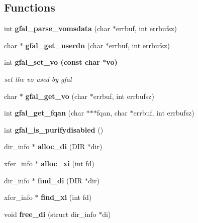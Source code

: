 \subsection*{Functions}
\begin{CompactItemize}
\item 
int \textbf{gfal\_\-parse\_\-vomsdata} (char $\ast$errbuf, int errbufsz)\label{gfal__common_8c_54942230ba2576538e1ad096332950b8}

\item 
char $\ast$ \textbf{gfal\_\-get\_\-userdn} (char $\ast$errbuf, int errbufsz)\label{group__internal__group_g6bd6336b0fee1ff32ad6bc5ef3d96068}

\item 
int \bf{gfal\_\-set\_\-vo} (const char $\ast$vo)\label{group__common__group_gcf4ae9045b7e5a2a697b1bb1f05994a8}

\begin{CompactList}\small\item\em set the vo used by gfal \item\end{CompactList}\item 
char $\ast$ \textbf{gfal\_\-get\_\-vo} (char $\ast$errbuf, int errbufsz)\label{group__internal__group_g1d7294ee456d16c8b1bf40f97ffb5081}

\item 
int \textbf{gfal\_\-get\_\-fqan} (char $\ast$$\ast$$\ast$fqan, char $\ast$errbuf, int errbufsz)\label{group__internal__group_g54b4e29078838583c8022630ef5a2ed3}

\item 
int \textbf{gfal\_\-is\_\-purifydisabled} ()\label{group__internal__group_g3a35f0e6f616c5108f95cfffd557db77}

\item 
dir\_\-info $\ast$ \textbf{alloc\_\-di} (DIR $\ast$dir)\label{gfal__common_8c_8f269e9d06e4dd7d2512f0a6f4d56b1e}

\item 
xfer\_\-info $\ast$ \textbf{alloc\_\-xi} (int fd)\label{gfal__common_8c_5cfad4b7ae4af2b7a5024987d7cdc00f}

\item 
dir\_\-info $\ast$ \textbf{find\_\-di} (DIR $\ast$dir)\label{gfal__common_8c_1aae9f6db4f9e390d1f51246c8db9acd}

\item 
xfer\_\-info $\ast$ \textbf{find\_\-xi} (int fd)\label{gfal__common_8c_8257512b1e1452759e94f6238f28bea3}

\item 
void \textbf{free\_\-di} (struct dir\_\-info $\ast$di)\label{gfal__common_8c_ce8666ffef5eb0a0685827cc382fc383}


\end{CompactItemize}
